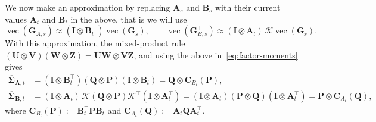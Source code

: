 \documentclass{article}
\renewcommand{\vec}{\operatorname{vec}}
\newcommand{\mat}[1]{\bm{#1}}
\begin{document}
We now make an approximation by replacing $\mat{A}_s$ and $\mat{B}_s$ with their current values $\mat{A}_t$ and $\mat{B}_t$ in the above, that is we will use
\[
  \vec(\mat{G}_{A,s}) \approx (\mat{I} \otimes \mat{B}_t^\top)\vec(\mat{G}_s),
  \qquad
  \vec(\mat{G}_{B,s}^\top) 
    \approx (\mat{I} \otimes \mat{A}_t)\,\mathcal{K}\vec(\mat{G}_s).
\]
 With this approximation, the mixed-product rule $(\mat{U} \otimes \mat{V})(\mat{W} \otimes \mat{Z}) = \mat{U}\mat{W} \otimes \mat{VZ}$, and
using the above in~\eqref{eq:factor-moments} gives
\begin{equation}\label{eq:observable-moments}
\begin{aligned}
  \overline{\mat{\Sigma}}_{\mat{A},t} &= (\mat{I} \otimes \mat{B}_t^\top)(\mat{Q} \otimes \mat{P})(\mat{I} \otimes \mat{B}_t) = \mat{Q}\otimes \mat{C}_{B_t}(\mat{P}),\\
  \overline{\mat{\Sigma}}_{\mat{B},t} &= (\mat{I} \otimes \mat{A}_t)\,\mathcal{K}(\mat{Q} \otimes \mat{P})\mathcal{K}^\top(\mat{I} \otimes \mat{A}_t^\top) = (\mat{I} \otimes \mat{A}_t)(\mat{P} \otimes \mat{Q})(\mat{I} \otimes \mat{A}_t^\top) = \mat{P}\otimes \mat{C}_{A_t}(\mat{Q}),
\end{aligned}
\end{equation}
where $\mat{C}_{B_t}(\mat{P}):=\mat{B}_t^\top \mat{P} \mat{B}_t$ and $\mat{C}_{A_t}(\mat{Q}):=\mat{A}_t \mat{Q} \mat{A}_t^\top$.
\end{document}
